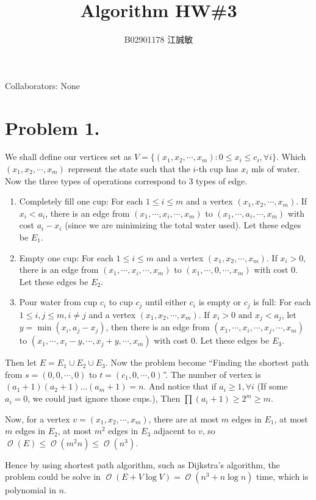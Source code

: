 \documentclass[12pt, a4paper]{article}
\title{Algorithm HW\#3}
\author{B02901178 江誠敏}
\newcommand{\opord}{\operatorname{\mathcal{O}}}
\newcommand{\ord}[1]{\opord\left(#1\right)}
\begin{document}
\maketitle
Collaborators: None

\section{Problem 1.}
We shall define our vertices set as $V = \{ (x_1, x_2, \cdots, x_m) : 0 \leq x_i \leq c_i, \forall i \}$.
Which $(x_1, x_2, \cdots, x_m)$ represent the state such that the $i$-th cup has $x_i$ mls of water.
Now the three types of operations correspond to 3 types of edge.
\begin{enumerate}
  \item Completely fill one cup: For each $1 \leq i \leq m$ and a vertex $(x_1, x_2, \cdots, x_m)$.
    If $x_i < a_i$, there is an edge from $(x_1, \cdots, x_i, \cdots, x_m)$ to
    $(x_1, \cdots, a_i, \cdots, x_m)$ with cost $a_i - x_i$ (since we are minimizing the total water used).
		Let these edges be $E_1$.
  \item Empty one cup: For each $1 \leq i \leq m$ and a vertex $(x_1, x_2, \cdots, x_m)$.
    If $x_i > 0$, there is an edge from $(x_1, \cdots, x_i, \cdots, x_m)$ to
    $(x_1, \cdots, 0, \cdots, x_m)$ with cost $0$.
		Let these edges be $E_2$.
  \item Pour water from cup $c_i$ to cup $c_j$ until either $c_i$ is empty or $c_j$ is full:
 		For each $1 \leq i, j \leq m, i \neq j$ and a vertex $(x_1, x_2, \cdots, x_m)$.
    If $x_i > 0 \text{ and } x_j < a_j$, let $y = \min(x_i, a_j - x_j)$, then there is an edge from
		$(x_1, \cdots, x_i, \cdots, x_j, \cdots, x_m)$ to $(x_1, \cdots, x_i-y, \cdots, x_j+y, \cdots, x_m)$ with cost $0$.
		Let these edges be $E_3$.
\end{enumerate}
Then let $E = E_1 \cup E_2 \cup E_3$. Now the problem become ``Finding the shortest path
from $s = (0, 0, \cdots, 0)$ to $t = (c_1, 0, \cdots, 0)$''. The number of vertex is
$(a_1 + 1) (a_2 + 1) \dots (a_m + 1) = n$. And notice that if $a_i \geq 1, \forall i$
(If some $a_i = 0$, we could just ignore those cups.), Then $\prod (a_i + 1) \geq 2^m \geq m$. 

Now, for a vertex $v = (x_1, x_2, \cdots, x_m)$, there are at most $m$ edges in $E_1$,
at most $m$ edges in $E_2$, at most $m^2$ edges in $E_3$ adjacent to $v$,
so $\ord{E} \leq \ord{m^2 n} \leq \ord{n^3}$.

Hence by using shortest path algorithm, such as Dijkstra's algorithm, the problem could be solve in
$\ord{E + V \log V} = \ord{n^3 + n \log n}$ time, which is polynomial in $n$.
\end{document}
